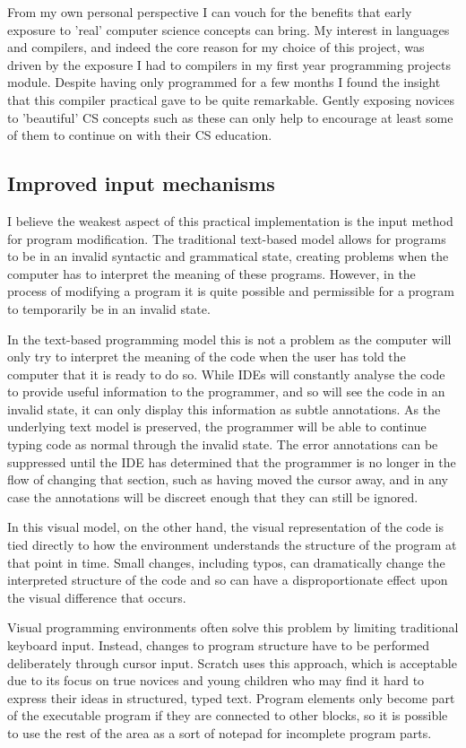 From my own personal perspective I can vouch for the benefits that early exposure to 'real' computer science concepts can bring. My interest in languages and compilers, and indeed the core reason for my choice of this project, was driven by the exposure I had to compilers in my first year programming projects module. Despite having only programmed for a few months I found the insight that this compiler practical gave to be quite remarkable. Gently exposing novices to 'beautiful' CS concepts such as these can only help to encourage at least some of them to continue on with their CS education. 

\subsection{Improved input mechanisms}

I believe the weakest aspect of this practical implementation is the input method for program modification. The traditional text-based model allows for programs to be in an invalid syntactic and grammatical state, creating problems when the computer has to interpret the meaning of these programs. However, in the process of modifying a program it is quite possible and permissible for a program to temporarily be in an invalid state.

In the text-based programming model this is not a problem as the computer will only try to interpret the meaning of the code when the user has told the computer that it is ready to do so. While IDEs will constantly analyse the code to provide useful information to the programmer, and so will see the code in an invalid state, it can only display this information as subtle annotations. As the underlying text model is preserved, the programmer will be able to continue typing code as normal through the invalid state. The error annotations can be suppressed until the IDE has determined that the programmer is no longer in the flow of changing that section, such as having moved the cursor away, and in any case the annotations will be discreet enough that they can still be ignored.

In this visual model, on the other hand, the visual representation of the code is tied directly to how the environment understands the structure of the program at that point in time. Small changes, including typos, can dramatically change the interpreted structure of the code and so can have a disproportionate effect upon the visual difference that occurs.

Visual programming environments often solve this problem by limiting traditional keyboard input. Instead, changes to program structure have to be performed deliberately through cursor input. Scratch uses this approach, which is acceptable due to its focus on true novices and young children who may find it hard to express their ideas in structured, typed text. Program elements only become part of the executable program if they are connected to other blocks, so it is possible to use the rest of the area as a sort of notepad for incomplete program parts.


